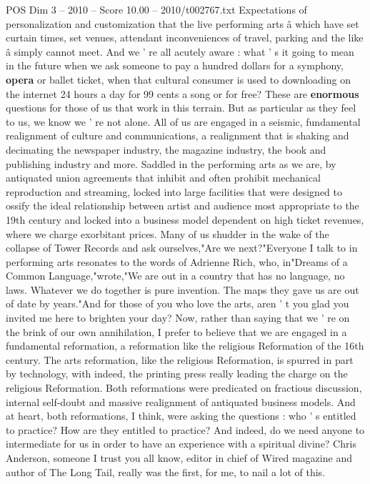 \begin{textsample}{POS Dim 3 – 2010 – Score 10.00 – 2010/t002767.txt}
Expectations of personalization and customization that the live performing arts â which have set curtain times, set venues, attendant inconveniences of travel, parking and the like â simply cannot meet.
And we ' re all acutely aware : what ' s it going to mean in the future when we ask someone to pay a hundred dollars for a symphony, \textbf{opera} or ballet ticket, when that cultural consumer is used to downloading on the internet 24 hours a day for 99 cents a song or for free?
These are \textbf{enormous} questions for those of us that work in this terrain.
But as particular as they feel to us, we know we ' re not alone.
All of us are engaged in a seismic, fundamental realignment of culture and communications, a realignment that is shaking and decimating the newspaper industry, the magazine industry, the book and publishing industry and more.
Saddled in the performing arts as we are, by antiquated union agreements that inhibit and often prohibit mechanical reproduction and streaming, locked into large facilities that were designed to ossify the ideal relationship between artist and audience most appropriate to the 19th century and locked into a business model dependent on high ticket revenues, where we charge exorbitant prices.
Many of us shudder in the wake of the collapse of Tower Records and ask ourselves,"Are we next?"Everyone I talk to in performing arts resonates to the words of Adrienne Rich, who, in"Dreams of a Common Language,"wrote,"We are out in a country that has no language, no laws.
Whatever we do together is pure invention.
The maps they gave us are out of date by years."And for those of you who love the arts, aren ' t you glad you invited me here to brighten your day?
Now, rather than saying that we ' re on the brink of our own annihilation, I prefer to believe that we are engaged in a fundamental reformation, a reformation like the religious Reformation of the 16th century.
The arts reformation, like the religious Reformation, is spurred in part by technology, with indeed, the printing press really leading the charge on the religious Reformation.
Both reformations were predicated on fractious discussion, internal self-doubt and massive realignment of antiquated business models.
And at heart, both reformations, I think, were asking the questions : who ' s entitled to practice?
How are they entitled to practice?
And indeed, do we need anyone to intermediate for us in order to have an experience with a spiritual divine?
Chris Anderson, someone I trust you all know, editor in chief of Wired magazine and author of The Long Tail, really was the first, for me, to nail a lot of this.

\end{textsample}
